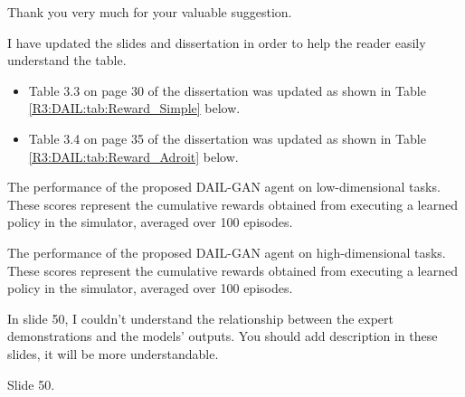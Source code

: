 \begin{revresponse}
  Thank you very much for your valuable suggestion.

  I have updated the slides and dissertation in order to help the reader easily understand the table.


  \begin{correction}
    \begin{itemize}
      \item Table 3.3 on page 30 of the dissertation was updated as shown in Table \ref{R3:DAIL:tab:Reward_Simple} below.
      \item Table 3.4 on page 35 of the dissertation was updated as shown in Table \ref{R3:DAIL:tab:Reward_Adroit} below.
    \end{itemize}

    {The performance of the proposed DAIL-GAN agent on low-dimensional tasks. These scores represent the cumulative rewards obtained from executing a learned policy in the simulator, averaged over 100 episodes.\label{R3:DAIL:tab:Reward_Simple}}

    {The performance of the proposed DAIL-GAN agent on high-dimensional tasks. These scores represent the cumulative rewards obtained from executing a learned policy in the simulator, averaged over 100 episodes.\label{R3:DAIL:tab:Reward_Adroit}}

  \end{correction}
\end{revresponse}


\begin{revcomment}
  In slide 50,
  I couldn't understand the relationship between the expert demonstrations and the models' outputs.
  You should add description in these slides, it will be more understandable.

  {Slide 50.}
\end{revcomment}


